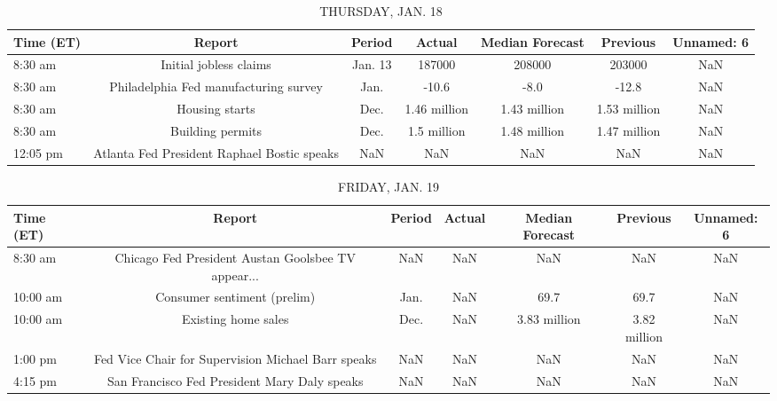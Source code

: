 \documentclass{article}%
\begin{document}
%


\begin{table}[htbp]%
\caption{THURSDAY, JAN. 18}%
\centering%
\begin{adjustbox}{width=1\textwidth}%
\begin{tabular}{lcccccc}
\toprule
Time (ET) &                                      Report &  Period &       Actual & Median Forecast &     Previous & Unnamed: 6 \\
\midrule
  8:30 am &                      Initial jobless claims & Jan. 13 &       187000 &          208000 &       203000 &        NaN \\
  8:30 am &       Philadelphia Fed manufacturing survey &    Jan. &        -10.6 &            -8.0 &        -12.8 &        NaN \\
  8:30 am &                              Housing starts &    Dec. & 1.46 million &    1.43 million & 1.53 million &        NaN \\
  8:30 am &                            Building permits &    Dec. &  1.5 million &    1.48 million & 1.47 million &        NaN \\
 12:05 pm & Atlanta Fed President Raphael Bostic speaks &     NaN &          NaN &             NaN &          NaN &        NaN \\
\bottomrule
\end{tabular}
%
\end{adjustbox}%
\end{table}

%


\begin{table}[htbp]%
\caption{FRIDAY, JAN. 19}%
\centering%
\begin{adjustbox}{width=1\textwidth}%
\begin{tabular}{lcccccc}
\toprule
Time (ET) &                                             Report & Period & Actual & Median Forecast &     Previous & Unnamed: 6 \\
\midrule
  8:30 am & Chicago Fed President Austan Goolsbee TV appear... &    NaN &    NaN &             NaN &          NaN &        NaN \\
 10:00 am &                        Consumer sentiment (prelim) &   Jan. &    NaN &            69.7 &         69.7 &        NaN \\
 10:00 am &                                Existing home sales &   Dec. &    NaN &    3.83 million & 3.82 million &        NaN \\
  1:00 pm & Fed Vice Chair for Supervision Michael Barr speaks &    NaN &    NaN &             NaN &          NaN &        NaN \\
  4:15 pm &       San Francisco Fed President Mary Daly speaks &    NaN &    NaN &             NaN &          NaN &        NaN \\
\bottomrule
\end{tabular}
%
\end{adjustbox}%
\end{table}
\end{document}
